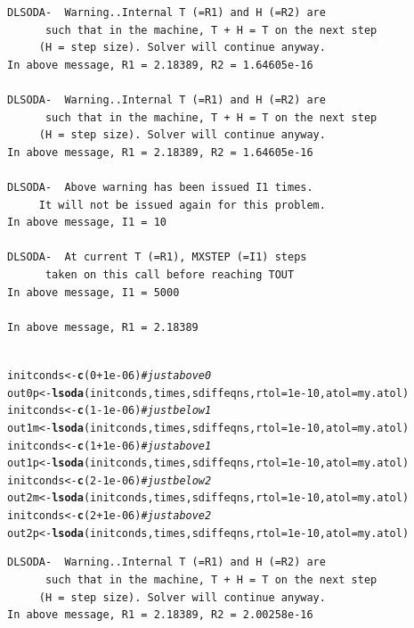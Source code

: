 \documentclass[Tutorial]{../cbg}\usepackage[]{graphicx}\usepackage[]{color}
\makeatletter
\newcommand{\hlnum}[1]{\textcolor[rgb]{0.686,0.059,0.569}{#1}}%
\newcommand{\hlcom}[1]{\textcolor[rgb]{0.678,0.584,0.686}{\textit{#1}}}%
\newcommand{\hlopt}[1]{\textcolor[rgb]{0,0,0}{#1}}%
\newcommand{\hlstd}[1]{\textcolor[rgb]{0.345,0.345,0.345}{#1}}%
\newcommand{\hlkwb}[1]{\textcolor[rgb]{0.69,0.353,0.396}{#1}}%
\newcommand{\hlkwc}[1]{\textcolor[rgb]{0.333,0.667,0.333}{#1}}%
\newcommand{\hlkwd}[1]{\textcolor[rgb]{0.737,0.353,0.396}{\textbf{#1}}}%
\newenvironment{kframe}{%
 \def\at@end@of@kframe{}%
 \ifinner\ifhmode%
  \def\at@end@of@kframe{\end{minipage}}%
  \begin{minipage}{\columnwidth}%
 \fi\fi%
 \def\FrameCommand##1{\hskip\@totalleftmargin \hskip-\fboxsep
 \colorbox{shadecolor}{##1}\hskip-\fboxsep
     \hskip-\linewidth \hskip-\@totalleftmargin \hskip\columnwidth}%
 \MakeFramed {\advance\hsize-\width
   \@totalleftmargin\z@ \linewidth\hsize
   \@setminipage}}%
 {\par\unskip\endMakeFramed%
 \at@end@of@kframe}
\newenvironment{knitrout}{}{} %
\makeatother
\begin{document}
\begin{knitrout}
\begin{kframe}
\begin{verbatim}
DLSODA-  Warning..Internal T (=R1) and H (=R2) are
      such that in the machine, T + H = T on the next step  
     (H = step size). Solver will continue anyway.
In above message, R1 = 2.18389, R2 = 1.64605e-16
 
DLSODA-  Warning..Internal T (=R1) and H (=R2) are
      such that in the machine, T + H = T on the next step  
     (H = step size). Solver will continue anyway.
In above message, R1 = 2.18389, R2 = 1.64605e-16
 
DLSODA-  Above warning has been issued I1 times.  
     It will not be issued again for this problem.
In above message, I1 = 10
 
DLSODA-  At current T (=R1), MXSTEP (=I1) steps   
      taken on this call before reaching TOUT     
In above message, I1 = 5000
 
In above message, R1 = 2.18389
 
\end{verbatim}
\begin{alltt}
\hlstd{initconds} \hlkwb{<-} \hlkwd{c}\hlstd{(}\hlnum{0} \hlopt{+} \hlnum{1e-06}\hlstd{)}  \hlcom{# just above 0}
\hlstd{out0p} \hlkwb{<-} \hlkwd{lsoda}\hlstd{(initconds, times, sdiffeqns,} \hlkwc{rtol} \hlstd{=} \hlnum{1e-10}\hlstd{,} \hlkwc{atol} \hlstd{= my.atol)}
\hlstd{initconds} \hlkwb{<-} \hlkwd{c}\hlstd{(}\hlnum{1} \hlopt{-} \hlnum{1e-06}\hlstd{)}  \hlcom{# just below 1}
\hlstd{out1m} \hlkwb{<-} \hlkwd{lsoda}\hlstd{(initconds, times, sdiffeqns,} \hlkwc{rtol} \hlstd{=} \hlnum{1e-10}\hlstd{,} \hlkwc{atol} \hlstd{= my.atol)}
\hlstd{initconds} \hlkwb{<-} \hlkwd{c}\hlstd{(}\hlnum{1} \hlopt{+} \hlnum{1e-06}\hlstd{)}  \hlcom{# just above 1}
\hlstd{out1p} \hlkwb{<-} \hlkwd{lsoda}\hlstd{(initconds, times, sdiffeqns,} \hlkwc{rtol} \hlstd{=} \hlnum{1e-10}\hlstd{,} \hlkwc{atol} \hlstd{= my.atol)}
\hlstd{initconds} \hlkwb{<-} \hlkwd{c}\hlstd{(}\hlnum{2} \hlopt{-} \hlnum{1e-06}\hlstd{)}  \hlcom{# just below 2}
\hlstd{out2m} \hlkwb{<-} \hlkwd{lsoda}\hlstd{(initconds, times, sdiffeqns,} \hlkwc{rtol} \hlstd{=} \hlnum{1e-10}\hlstd{,} \hlkwc{atol} \hlstd{= my.atol)}
\hlstd{initconds} \hlkwb{<-} \hlkwd{c}\hlstd{(}\hlnum{2} \hlopt{+} \hlnum{1e-06}\hlstd{)}  \hlcom{# just above 2}
\hlstd{out2p} \hlkwb{<-} \hlkwd{lsoda}\hlstd{(initconds, times, sdiffeqns,} \hlkwc{rtol} \hlstd{=} \hlnum{1e-10}\hlstd{,} \hlkwc{atol} \hlstd{= my.atol)}
\end{alltt}
\begin{verbatim}
DLSODA-  Warning..Internal T (=R1) and H (=R2) are
      such that in the machine, T + H = T on the next step  
     (H = step size). Solver will continue anyway.
In above message, R1 = 2.18389, R2 = 2.00258e-16
 

\end{verbatim}
\end{kframe}
\end{knitrout}
\end{document}
